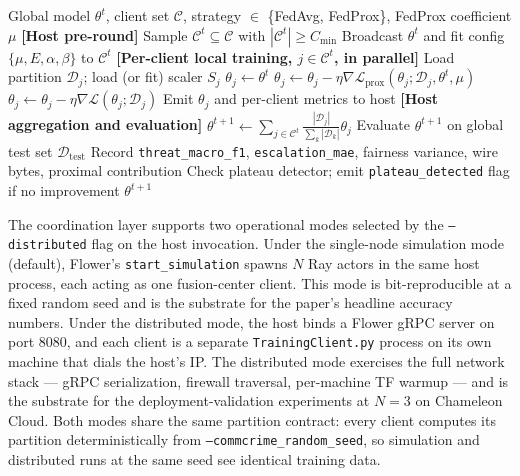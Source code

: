 \documentclass[conference]{IEEEtran}
\begin{document}
\begin{algorithm}[!htbp]
\caption{ATLAS Federated Training Round}
\label{alg:atlas_round}
\begin{algorithmic}[1]
\Require Global model $\theta^{t}$, client set $\mathcal{C}$, strategy $\in$ \{FedAvg, FedProx\}, FedProx coefficient $\mu$
\State \textbf{[Host pre-round]}
\State Sample $\mathcal{C}^{t} \subseteq \mathcal{C}$ with $|\mathcal{C}^{t}| \geq C_{\min}$
\State Broadcast $\theta^{t}$ and fit config $\{\mu, E, \alpha, \beta\}$ to $\mathcal{C}^{t}$
\Statex
\State \textbf{[Per-client local training, $j \in \mathcal{C}^{t}$, in parallel]}
  \State Load partition $\mathcal{D}_{j}$; load (or fit) scaler $S_{j}$
  \State $\theta_{j} \gets \theta^{t}$
      \State $\theta_{j} \gets \theta_{j} - \eta \nabla \mathcal{L}_{\text{prox}}(\theta_{j}; \mathcal{D}_{j}, \theta^{t}, \mu)$
    \Else
      \State $\theta_{j} \gets \theta_{j} - \eta \nabla \mathcal{L}(\theta_{j}; \mathcal{D}_{j})$
    \EndIf
  \EndFor
  \State Emit $\theta_{j}$ and per-client metrics to host
\EndFor
\Statex
\State \textbf{[Host aggregation and evaluation]}
\State $\theta^{t+1} \gets \sum_{j \in \mathcal{C}^{t}} \frac{|\mathcal{D}_{j}|}{\sum_{k} |\mathcal{D}_{k}|} \theta_{j}$ 
\State Evaluate $\theta^{t+1}$ on global test set $\mathcal{D}_{\text{test}}$
\State Record \texttt{threat\_macro\_f1}, \texttt{escalation\_mae}, fairness variance, wire bytes, proximal contribution
\State Check plateau detector; emit \texttt{plateau\_detected} flag if no improvement
\State \Return $\theta^{t+1}$
\end{algorithmic}
\end{algorithm}

The coordination layer supports two operational modes selected by the \texttt{--distributed} flag on the host invocation. Under the single-node simulation mode (default), Flower's \texttt{start\_simulation} spawns $N$ Ray actors in the same host process, each acting as one fusion-center client. This mode is bit-reproducible at a fixed random seed and is the substrate for the paper's headline accuracy numbers. Under the distributed mode, the host binds a Flower gRPC server on port 8080, and each client is a separate \texttt{TrainingClient.py} process on its own machine that dials the host's IP. The distributed mode exercises the full network stack --- gRPC serialization, firewall traversal, per-machine TF warmup --- and is the substrate for the deployment-validation experiments at $N=3$ on Chameleon Cloud. Both modes share the same partition contract: every client computes its partition deterministically from \texttt{--commcrime\_random\_seed}, so simulation and distributed runs at the same seed see identical training data.
\end{document}

